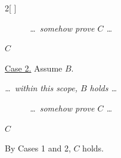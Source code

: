 \begin{figure}
\begin{multicols}{2}[
      ]
{\begin{steps}
\begin{steps}
        \item[] ~~~~~~\emph{\ldots~somehow prove $C$ \ldots }

        \item[2.3.] $C$
          
        \end{steps}

        \begin{steps}
          
        \item[3.1.] \underline{Case 2.}  Assume $B$. 

        \item[3.2.] \emph{ \ldots~within this scope, $B$ holds \ldots}

        \item[] ~~~~~~\emph{\ldots~somehow prove $C$ \ldots }

        \item[3.3.] $C$
          
        \end{steps}

      \item[4.] By Cases 1 and 2, $C$ holds.

      \end{steps}
    }

    \vspace*{2pt}

\end{multicols}
\end{figure}
